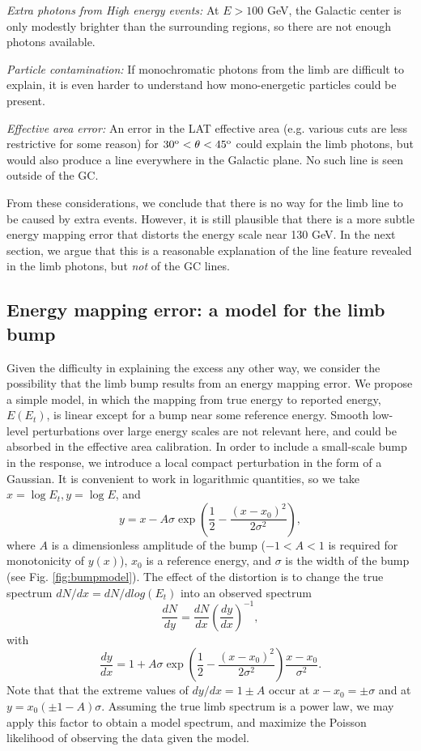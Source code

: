 \documentclass[aps,twocolumn,prd,superscriptaddress,showpacs,nofootinbib,fixfloat]{revtex4}
\newcommand{\be}{\begin{equation}}
\newcommand{\ee}{\end{equation}}
\newcommand{\degree}{^{\rm o}}
\begin{document}
{\it Extra photons from High energy events:} At $E > 100$
GeV, the Galactic center is only modestly brighter than the
surrounding regions, so there are not enough photons
available.

{\it Particle contamination:} If monochromatic photons from
the limb are difficult to explain, it is even harder to
understand how mono-energetic particles could be present.

{\it Effective area error:} An error in the LAT effective
area (e.g. various cuts are less restrictive for some
reason) for $30\degree < \theta < 45\degree$ could explain
the limb photons, but would also produce a line everywhere
in the Galactic plane.  No such line is seen outside of the
GC.\medskip

From these considerations, we conclude that there is no way
for the limb line to be caused by extra events. However, it
is still plausible that there is a more subtle energy
mapping error that distorts the energy scale near 130 GeV.
In the next section, we argue that this is a reasonable
explanation of the line feature revealed in the limb
photons, but {\em not} of the GC lines. 

\subsection{Energy mapping error: a model for the limb bump}

 
Given the difficulty in explaining the excess any other way,
we consider the possibility that the limb bump results from
an energy mapping error.  We propose a simple model, in
which the mapping from true energy to reported energy,
$E(E_t)$, is linear except for a bump near some reference
energy.  Smooth low-level perturbations over large energy
scales are not relevant here, and could be absorbed in the
effective area calibration.  In order to include a
small-scale bump in the response, we introduce a local
compact perturbation in the form of a Gaussian.  It is
convenient to work in logarithmic quantities, so we take
$x=\log E_t, y=\log E$, and \be
\label{eq:yofx}
y=x - A\sigma \exp\left(\frac{1}{2}-\frac{(x-x_0)^2}{2\sigma^2}\right),
\ee
where $A$ is a dimensionless amplitude of the bump ($-1<A<1$
is required for monotonicity of $y(x)$), $x_0$ is a
reference energy, and $\sigma$ is the width of the bump (see
Fig. \ref{fig:bumpmodel}).  The effect of the distortion is
to change the true spectrum $dN/dx = dN/dlog(E_t)$ into an
observed spectrum
\be
\label{eq:dndy}
\frac{dN}{dy} = \frac{dN}{dx} \left(\frac{dy}{dx}\right)^{-1} ,
\ee
with
\be
\label{eq:dydx}
\frac{dy}{dx} = 1 + A\sigma \exp\left(\frac{1}{2}-\frac{(x-x_0)^2}{2\sigma^2}\right)
\frac{x-x_0}{\sigma^2}.
\ee
Note that that the extreme values of $dy/dx = 1 \pm A$ occur
at $x-x_0 = \pm \sigma$ and at $y=x_0(\pm1-A)\sigma$.
Assuming the true limb spectrum is a power law, we may apply
this factor to obtain a model spectrum, and maximize the
Poisson likelihood of observing the data given the model.
\end{document}
